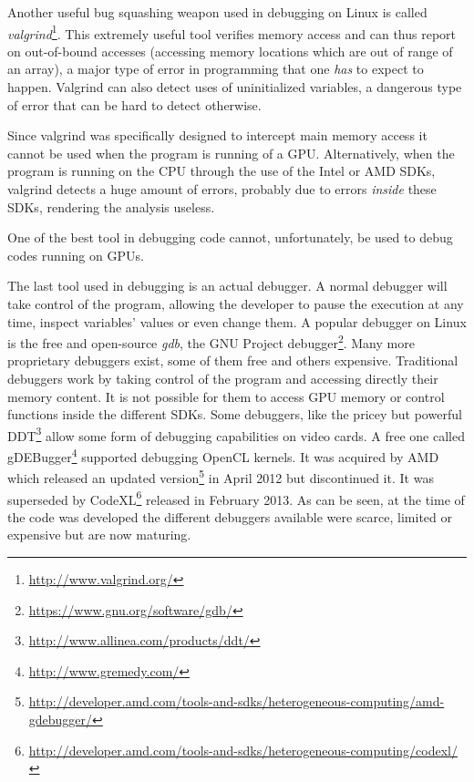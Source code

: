 \label{section:tools:opencl:valgrind}

Another useful bug squashing weapon used in debugging on Linux is called
\textit{valgrind}\footnote{\url{http://www.valgrind.org/}}. This extremely
useful tool verifies memory access and can thus report on out-of-bound accesses
(accessing memory locations which are out of range of an array), a major
type of error in programming that one \textit{has} to expect to happen.
Valgrind can also detect uses of uninitialized variables, a dangerous type of
error that can be hard to detect otherwise.

Since valgrind was specifically designed to intercept main memory access it
cannot be used when the program is running of a GPU. Alternatively, when the
program is running on the CPU through the use of the Intel or AMD SDKs, valgrind
detects a huge amount of errors, probably due to errors \textit{inside} these
SDKs, rendering the analysis useless.

One of the best tool in debugging code cannot, unfortunately, be used to debug
codes running on GPUs.



The last tool used in debugging is an actual debugger. A normal debugger will
take control of the program, allowing the developer to pause the execution
at any time, inspect variables' values or even change them. A popular debugger
on Linux is the free and open-source \textit{gdb}, the GNU Project
debugger\footnote{\url{https://www.gnu.org/software/gdb/}}. Many more
proprietary debuggers exist, some of them free and others expensive. Traditional
debuggers work by taking control of the program and accessing
directly their memory content. It is not possible for them to access GPU memory
or control functions inside the different SDKs. Some debuggers, like
the pricey but powerful DDT\footnote{\url{http://www.allinea.com/products/ddt/}}
allow some form of debugging capabilities on video cards. A free one
called gDEBugger\footnote{\url{http://www.gremedy.com/}} supported
debugging OpenCL kernels. It was acquired by AMD which released an updated
version\footnote{\url{http://developer.amd.com/tools-and-sdks/heterogeneous-computing/amd-gdebugger/}}
in April 2012 but discontinued it. It was superseded by
CodeXL\footnote{\url{http://developer.amd.com/tools-and-sdks/heterogeneous-computing/codexl/}}
released in February 2013. As can be seen, at the time of the code was developed
the different debuggers available were scarce, limited or expensive but are now
maturing.


